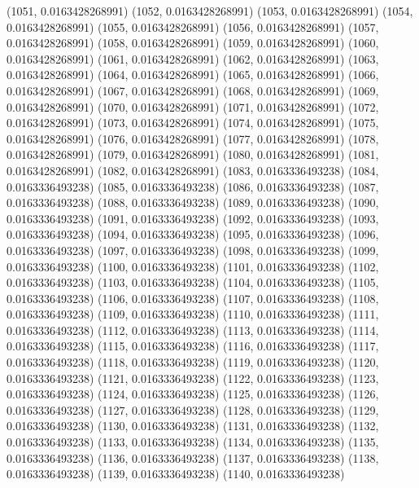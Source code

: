 {					(1051, 0.0163428268991)
					(1052, 0.0163428268991)
					(1053, 0.0163428268991)
					(1054, 0.0163428268991)
					(1055, 0.0163428268991)
					(1056, 0.0163428268991)
					(1057, 0.0163428268991)
					(1058, 0.0163428268991)
					(1059, 0.0163428268991)
					(1060, 0.0163428268991)
					(1061, 0.0163428268991)
					(1062, 0.0163428268991)
					(1063, 0.0163428268991)
					(1064, 0.0163428268991)
					(1065, 0.0163428268991)
					(1066, 0.0163428268991)
					(1067, 0.0163428268991)
					(1068, 0.0163428268991)
					(1069, 0.0163428268991)
					(1070, 0.0163428268991)
					(1071, 0.0163428268991)
					(1072, 0.0163428268991)
					(1073, 0.0163428268991)
					(1074, 0.0163428268991)
					(1075, 0.0163428268991)
					(1076, 0.0163428268991)
					(1077, 0.0163428268991)
					(1078, 0.0163428268991)
					(1079, 0.0163428268991)
					(1080, 0.0163428268991)
					(1081, 0.0163428268991)
					(1082, 0.0163428268991)
					(1083, 0.0163336493238)
					(1084, 0.0163336493238)
					(1085, 0.0163336493238)
					(1086, 0.0163336493238)
					(1087, 0.0163336493238)
					(1088, 0.0163336493238)
					(1089, 0.0163336493238)
					(1090, 0.0163336493238)
					(1091, 0.0163336493238)
					(1092, 0.0163336493238)
					(1093, 0.0163336493238)
					(1094, 0.0163336493238)
					(1095, 0.0163336493238)
					(1096, 0.0163336493238)
					(1097, 0.0163336493238)
					(1098, 0.0163336493238)
					(1099, 0.0163336493238)
					(1100, 0.0163336493238)
					(1101, 0.0163336493238)
					(1102, 0.0163336493238)
					(1103, 0.0163336493238)
					(1104, 0.0163336493238)
					(1105, 0.0163336493238)
					(1106, 0.0163336493238)
					(1107, 0.0163336493238)
					(1108, 0.0163336493238)
					(1109, 0.0163336493238)
					(1110, 0.0163336493238)
					(1111, 0.0163336493238)
					(1112, 0.0163336493238)
					(1113, 0.0163336493238)
					(1114, 0.0163336493238)
					(1115, 0.0163336493238)
					(1116, 0.0163336493238)
					(1117, 0.0163336493238)
					(1118, 0.0163336493238)
					(1119, 0.0163336493238)
					(1120, 0.0163336493238)
					(1121, 0.0163336493238)
					(1122, 0.0163336493238)
					(1123, 0.0163336493238)
					(1124, 0.0163336493238)
					(1125, 0.0163336493238)
					(1126, 0.0163336493238)
					(1127, 0.0163336493238)
					(1128, 0.0163336493238)
					(1129, 0.0163336493238)
					(1130, 0.0163336493238)
					(1131, 0.0163336493238)
					(1132, 0.0163336493238)
					(1133, 0.0163336493238)
					(1134, 0.0163336493238)
					(1135, 0.0163336493238)
					(1136, 0.0163336493238)
					(1137, 0.0163336493238)
					(1138, 0.0163336493238)
					(1139, 0.0163336493238)
					(1140, 0.0163336493238)
}
